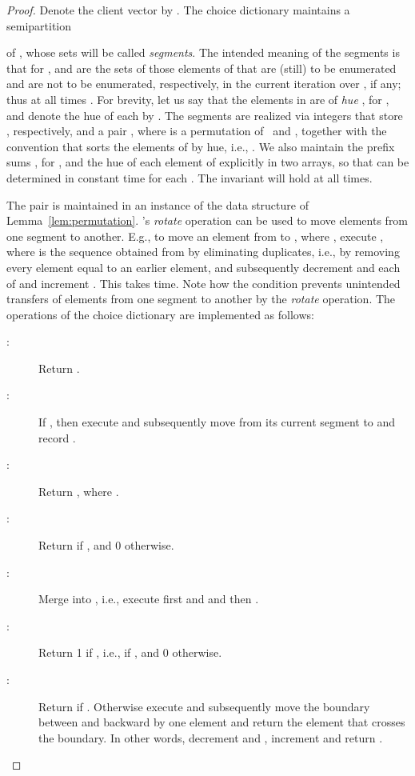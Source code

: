 \documentclass[envcountsame,envcountsect,undated,nolinenumbers]{lnthi}
\def\Tvn#1{\hbox{\textit{#1\/}}}
\begin{document}
\begin{proof}
Denote the client vector by .
The choice dictionary maintains a semipartition

of , whose sets
will be called \emph{segments}.
The intended meaning of the segments is that
for ,  and 
are the sets of those elements of  that are (still)
to be enumerated and are not to be enumerated, respectively,
in the current iteration over , if any;
thus at all times .
For brevity, let us say that the elements in 
are of \emph{hue} , for , and
denote the hue of each  by .
The segments are realized via  integers
 that store ,
respectively, and a pair ,
where  is a permutation of~ and
,
together with
the convention that
 sorts the elements of  by hue, i.e.,
.
We also maintain the prefix sums
, for ,
and the hue of each element of 
explicitly in two arrays, so that 
can be determined in constant time for each .
The invariant  will hold at all times.

The pair  is maintained in an instance
 of the data structure of Lemma~\ref{lem:permutation}.
's \Tvn{rotate} operation can be used
to move elements from one segment to another.
E.g., to move an element  from  to
, where ,
execute ,
where  is the sequence obtained
from 
by eliminating duplicates, i.e., by removing every
element equal to an earlier element,
and subsequently decrement 
and each of  and increment .
This takes  time.
Note how the condition  prevents
unintended transfers of elements from one segment to another
by the \Tvn{rotate} operation.
The operations of the choice dictionary
are implemented as follows:

\begin{description}
\item[\normalfont :]
Return .
\item[\normalfont :]
If ,
then execute  and subsequently move 
from its current segment to 
and record .
\item[\normalfont :]
Return , where .
\item[\normalfont :]
Return  if
, and 0 otherwise.
\item[\normalfont :]
Merge  into , i.e.,
execute first 
and  and then .
\item[\normalfont :]
Return 1 if , i.e., if ,
and 0 otherwise.
\item[\normalfont :]
Return  if .
Otherwise execute  and subsequently
move the boundary between  and  backward
by one element and return the element that crosses the boundary.
In other words, decrement  and , increment
 and return .
\end{description}


\end{proof}
\end{document}
